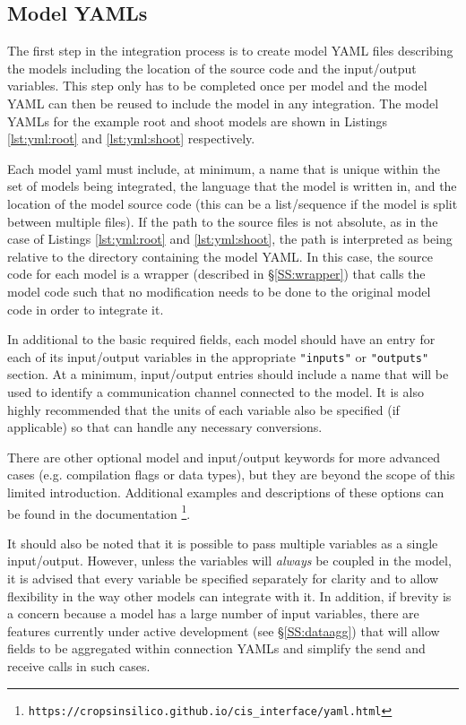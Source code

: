 \documentclass[journal]{IEEEtran}
\newcommand{\todo}[1]{{\color{red}{#1}}}
\newcommand{\pkg}{{\tt \todo{cis\_interface}}{}}
\newcommand{\rootyml}{}
\newcommand{\shootyml}{}
\begin{document}
\subsection{Model YAMLs}\label{SS:model_yaml}
%
The first step in the integration process is to create model YAML files describing the models including the location of the source code and the input/output variables. This step only has to be completed once per model and the model YAML can then be reused to include the model in any integration. The model YAMLs for the example root and shoot models are shown in Listings \ref{lst:yml:root} and \ref{lst:yml:shoot} respectively.
%
\rootyml
%
\shootyml
%
Each model yaml must include, at minimum, a name that is unique within the set of models being integrated, the language that the model is written in, and the location of the model source code (this can be a list/sequence if the model is split between multiple files). If the path to the source files is not absolute, as in the case of Listings \ref{lst:yml:root} and \ref{lst:yml:shoot}, the path is interpreted as being relative to the directory containing the model YAML. In this case, the source code for each model is a wrapper (described in \S\ref{SS:wrapper}) that calls the model code such that no modification needs to be done to the original model code in order to integrate it.

In additional to the basic required fields, each model should have an entry for each of its input/output variables in the appropriate {\tt "inputs"} or {\tt "outputs"} section. At a minimum, input/output entries should include a name that will be used to identify a communication channel connected to the model. It is also highly recommended that the units of each variable also be specified (if applicable) so that {\pkg} can handle any necessary conversions.

There are other optional model and input/output keywords for more advanced cases (e.g. compilation flags or data types), but they are beyond the scope of this limited introduction. Additional examples and descriptions of these options can be found in the documentation \footnote{{\tt https://cropsinsilico.github.io/cis\_interface/yaml.html}}.

It should also be noted that it is possible to pass multiple variables as a single input/output. However, unless the variables will \emph{always} be coupled in the model, it is advised that every variable be specified separately for clarity and to allow flexibility in the way other models can integrate with it. In addition, if brevity is a concern because a model has a large number of input variables, there are features currently under active development (see \S\ref{SS:dataagg}) that will allow fields to be aggregated within connection YAMLs and simplify the send and receive calls in such cases.
\end{document}
